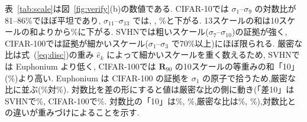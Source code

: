 \documentclass[MIRU,submit,onecolumn]{miru2025j}
\newcommand{\Rot}[1]{\mathbf{R}_{#1}}
\renewcommand{\eqref}[1]{(\ref{#1})}   %
\begin{document}
表~\ref{tab:scale}は図~\ref{fig:verify}(b)の数値である. %
CIFAR-10では $\sigma_1$--$\sigma_9$ の対数比が81--86\%でほぼ平坦であり, $\sigma_{11}$--$\sigma_{13}$ では\psDropACten{}, \psDropBCten{}, \psDropCCten\%と下がる. 13スケールの和は10スケールの和より\gTenCten{}から\gThirteenCten\%に下がる. %
SVHNでは粗いスケール($\sigma_7$--$\sigma_{10}$)の証拠が強く, CIFAR-100では証拠が細かいスケール($\sigma_1$--$\sigma_3$ で70\%以上)にほぼ限られる.%
厳密な比は式~\eqref{eq:disc}の重み $\hat e_k$ によって細かいスケールを重く数えるため, SVHNでは Euphonium より低く, CIFAR-100では $\Rot{90}$ の10スケールの等重みの和「10」(\gTenCh\%)より高い. Euphonium は CIFAR-100 の証拠を $\sigma_1$ の原子で拾うため,厳密な比に並ぶ(\oGCh\%対\oODECh\%). 対数比を差の形にすると値は厳密な比の側に動き(「差10」はSVHNで\dTenSVHN\%, CIFAR-100で\dTenCh\%. 対数比の「10」は\gTenSVHN\%, \gTenCh\%,厳密な比は\oODESVHN\%, \oODECh\%),対数比との違いが重みづけによることを示す.
\end{document}
